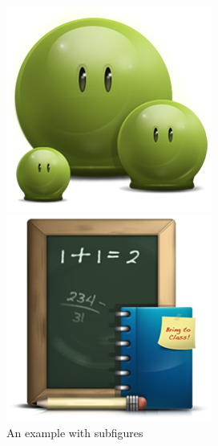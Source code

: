 \begin{figure}[hbt!]
\centering
%
\begin{minipage}{0.3\textwidth}
\centering
\includegraphics[width=\linewidth]{green}
\end{minipage}
%
\hspace{1cm}
%
\begin{minipage}{0.3\textwidth}
\centering
\includegraphics[width=\linewidth]{school}
\end{minipage}

\caption{An example with subfigures}
\end{figure}

